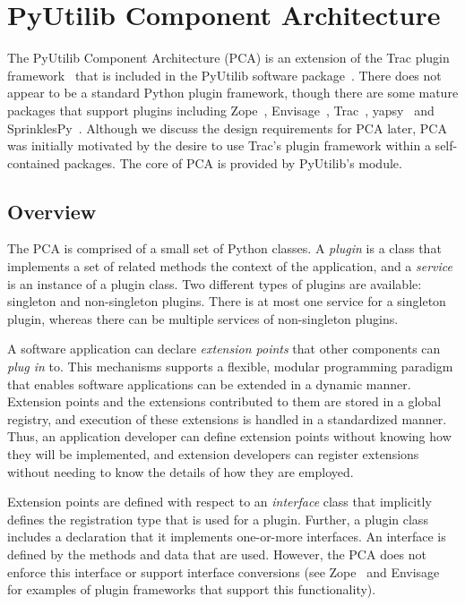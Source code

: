 
\chapter{PyUtilib Component Architecture}

\label{chap:pca}

The PyUtilib Component Architecture (PCA) is an extension of the Trac
plugin framework~\cite{Trac} that is included in the PyUtilib software
package~\cite{PyUtilib}.  There does not appear to be a standard
Python plugin framework, though there are some mature packages that
support plugins including Zope~\cite{Zope}, Envisage~\cite{Envisage},
Trac~\cite{Trac}, yapsy~\cite{yapsy} and SprinklesPy~\cite{SprinklesPy}.
Although we discuss the design requirements for PCA later, PCA was
initially motivated by the desire to use Trac's plugin framework within
a self-contained packages.  The core of PCA is provided by PyUtilib's
 module.

\section{Overview}

The PCA is comprised of a small set of Python classes. A \textit{plugin}
is a class that implements a set of related methods the context of the
application, and a \textit{service} is an instance of a plugin class. Two
different types of plugins are available: singleton and non-singleton
plugins. There is at most one service for a singleton plugin, whereas
there can be multiple services of non-singleton plugins.

A software application can declare \textit{extension points} that other
components can \textit{plug in} to. This mechanisms supports a flexible,
modular programming paradigm that enables software applications can
be extended in a dynamic manner. Extension points and the extensions
contributed to them are stored in a global registry, and execution of
these extensions is handled in a standardized manner. Thus, an application
developer can define extension points without knowing how they will be
implemented, and extension developers can register extensions without
needing to know the details of how they are employed.

Extension points are defined with respect to an \textit{interface} class
that implicitly defines the registration type that is used for a
plugin. Further, a plugin class includes a declaration that it implements
one-or-more interfaces. An interface is defined by the methods and data
that are used. However, the PCA does not enforce
this interface or support interface conversions (see Zope~\cite{Zope}
and Envisage~\cite{Envisage} for examples of plugin frameworks that
support this functionality).


